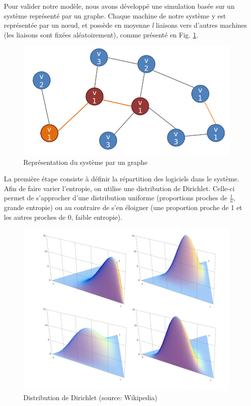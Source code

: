 Pour valider notre modèle, nous avons développé une simulation basée sur un système représenté par un  graphe.
Chaque machine de notre système y est représentée par un nœud, et possède en moyenne \textit{l} liaisons vers d'autres machines (les liaisons sont fixées aléatoirement), comme présenté en Fig. \ref{graph}.

\begin{figure}[!ht]
\centering
     \includegraphics[width=1.0\linewidth]{Paul/python/graph.png}
     \caption{Représentation du système par un graphe}
     \label{graph}
\end{figure}

La première étape consiste à définir la répartition des logiciels dans le système. Afin de faire varier l'entropie, on utilise une distribution de Dirichlet. Celle-ci permet de s'approcher d'une distribution uniforme (proportions proches de $\frac{1}{n}$, grande entropie) ou au contraire de s'en éloigner (une proportion proche de 1 et les autres proches de 0, faible entropie). 

\begin{figure}[!ht]
\centering
     \includegraphics[width=1.0\linewidth]{Paul/python/dirichlet.png}
     \caption{Distribution de Dirichlet (source: Wikipedia)}
     \label{dirichlet}
\end{figure}

